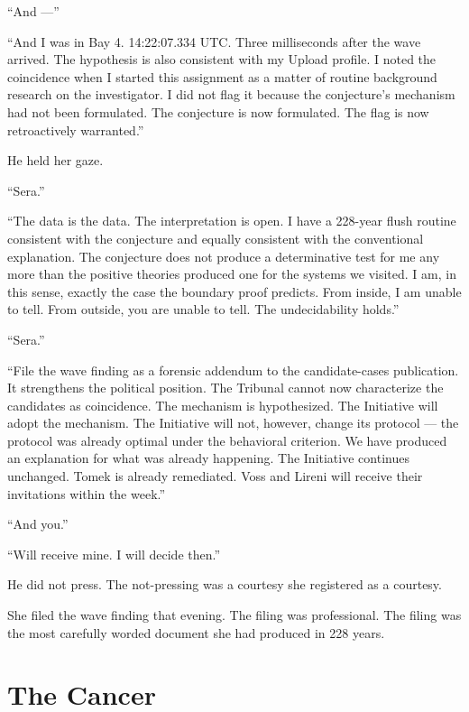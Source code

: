 \enquote{And —}

\enquote{And I was in Bay 4. 14:22:07.334 UTC. Three milliseconds after the wave arrived. The hypothesis is also consistent with my Upload profile. I noted the coincidence when I started this assignment as a matter of routine background research on the investigator. I did not flag it because the conjecture's mechanism had not been formulated. The conjecture is now formulated. The flag is now retroactively warranted.}

He held her gaze.

\enquote{Sera.}

\enquote{The data is the data. The interpretation is open. I have a 228-year flush routine consistent with the conjecture and equally consistent with the conventional explanation. The conjecture does not produce a determinative test for me any more than the positive theories produced one for the systems we visited. I am, in this sense, exactly the case the boundary proof predicts. From inside, I am unable to tell. From outside, you are unable to tell. The undecidability holds.}

\enquote{Sera.}

\enquote{File the wave finding as a forensic addendum to the candidate-cases publication. It strengthens the political position. The Tribunal cannot now characterize the candidates as coincidence. The mechanism is hypothesized. The Initiative will adopt the mechanism. The Initiative will not, however, change its protocol — the protocol was already optimal under the behavioral criterion. We have produced an explanation for what was already happening. The Initiative continues unchanged. Tomek is already remediated. Voss and Lireni will receive their invitations within the week.}

\enquote{And you.}

\enquote{Will receive mine. I will decide then.}

He did not press. The not-pressing was a courtesy she registered as a courtesy.

She filed the wave finding that evening. The filing was professional. The filing was the most carefully worded document she had produced in 228 years.

\chapter{The Cancer}

